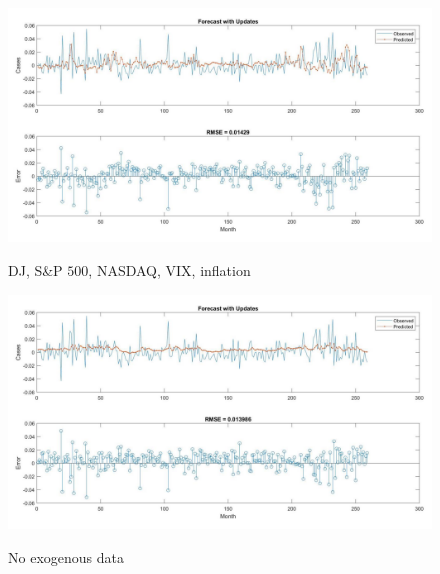 \documentclass[12pt]{article}
\begin{document}
    \begin{minipage}{0.5\textwidth}
        \begin{figure}[H]
            \centering
            \caption{DJ, S\&P $500$, NASDAQ, VIX, inflation}
            \includegraphics[scale=0.28]{../shreya/lstm1.pdf}
            \label{fig:LSTM-shreya-1}
        \end{figure}
    \end{minipage}
    \begin{minipage}{0.5\textwidth}
        \begin{figure}[H]
            \centering
            \caption{No exogenous data}
            \includegraphics[scale=0.28]{../shreya/lstm4.pdf}
            \label{fig:LSTM-shreya-4}
        \end{figure}
    \end{minipage}
\end{document}
